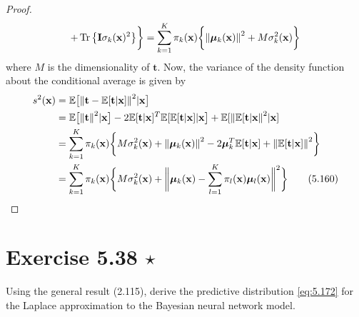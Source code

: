 \begin{proof}
\[            + \Tr\big\{\mathbf{I} \sigma_k(\mathbf{x})^2\big\}\bigg\}
        = \sum_{k=1}^{K} \pi_k(\mathbf{x})\bigg\{
            \norm{\bm{\mu}_k(\mathbf{x})}^2 + M\sigma_k^2(\mathbf{x})\bigg\}
    \] 
    where $M$ is the dimensionality of $\mathbf{t}$.
    Now, the variance of the density function about the conditional average is given by
    \begin{align*}
        s^2(\mathbf{x}) 
        &= \mathbb{E}\big[\norm{\mathbf{t} 
            - \mathbb{E}[\mathbf{t} | \mathbf{x}]}^2 | \mathbf{x}\big] \\
        &= \mathbb{E}\big[\norm{\mathbf{t}}^2 | \mathbf{x}\big] 
        - 2\mathbb{E}[\mathbf{t} | \mathbf{x}]^T 
            \mathbb{E}[\mathbb{E}[\mathbf{t} | \mathbf{x}] | \mathbf{x}\big]
            + \mathbb{E}[\norm{\mathbb{E}[\mathbf{t} | \mathbf{x}}^2 | \mathbf{x}] \\
        &= \sum_{k=1}^{K} \pi_k(\mathbf{x}) \bigg\{
            M\sigma_k^2(\mathbf{x}) + \norm{\bm{\mu}_k(\mathbf{x})}^2 
            - 2\bm{\mu}_k^T \mathbb{E}[\mathbf{t} | \mathbf{x}] 
            + \norm{\mathbb{E}[\mathbf{t} | \mathbf{x}]}^2\bigg\} \\
        &= \sum_{k=1}^{K} \pi_k(\mathbf{x}) \bigg\{
            M\sigma_k^2(\mathbf{x}) + 
            \bigg\Vert
            \bm{\mu}_k(\mathbf{x})
            - \sum_{l=1}^{K} \pi_l(\mathbf{x}) \bm{\mu}_l(\mathbf{x})\bigg\Vert^2\bigg\}
        \tag{5.160}\label{eq:5.160}
    \end{align*}
\end{proof}

\section*{Exercise 5.38 $\star$}
Using the general result (2.115), derive the predictive distribution
\eqref{eq:5.172} for the Laplace approximation to the Bayesian neural network model.

\vspace{1em}

